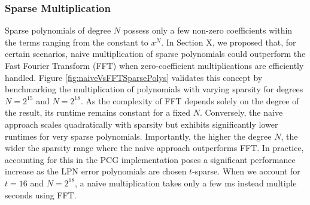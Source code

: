 \subsubsection{Sparse Multiplication}
Sparse polynomials of degree $N$ possess only a few non-zero coefficients within the terms ranging from the constant to $x^N$. In Section X, we proposed that, for certain scenarios, naive multiplication of sparse polynomials could outperform the Fast Fourier Transform (FFT) when zero-coefficient multiplications are efficiently handled. Figure \ref{fig:naiveVsFFTSparsePolys} validates this concept by benchmarking the multiplication of polynomials with varying sparsity for degrees $N=2^{15}$ and $N=2^{18}$. As the complexity of FFT depends solely on the degree of the result, its runtime remains constant for a fixed $N$.  Conversely, the naive approach scales quadratically with sparsity but exhibits significantly lower runtimes for very sparse polynomials. Importantly, the higher the degree $N$, the wider the sparsity range where the naive approach outperforms FFT. In practice, accounting for this in the PCG implementation poses a significant performance increase as the LPN error polynomials are chosen $t$-sparse. When we account for $t=16$ and $N=2^{18}$, a naive multiplication takes only a few ms instead multiple seconds using FFT.

